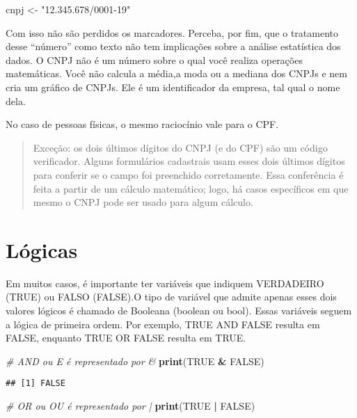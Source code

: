 \documentclass[
]{book}
\newenvironment{Shaded}{\begin{snugshade}}{\end{snugshade}}
\newcommand{\CommentTok}[1]{\textcolor[rgb]{0.56,0.35,0.01}{\textit{#1}}}
\newcommand{\KeywordTok}[1]{\textcolor[rgb]{0.13,0.29,0.53}{\textbf{#1}}}
\newcommand{\NormalTok}[1]{#1}
\newcommand{\OperatorTok}[1]{\textcolor[rgb]{0.81,0.36,0.00}{\textbf{#1}}}
\newcommand{\OtherTok}[1]{\textcolor[rgb]{0.56,0.35,0.01}{#1}}
\newcommand{\StringTok}[1]{\textcolor[rgb]{0.31,0.60,0.02}{#1}}
\begin{document}
\begin{Shaded}
\begin{Highlighting}[]
\NormalTok{cnpj <-}\StringTok{ "12.345.678/0001-19"}
\end{Highlighting}
\end{Shaded}

Com isso não são perdidos os marcadores. Perceba, por fim, que o tratamento desse ``número'' como texto não tem implicações sobre a análise estatística dos dados. O CNPJ não é um número sobre o qual você realiza operações matemáticas. Você não calcula a média,a moda ou a mediana dos CNPJs e nem cria um gráfico de CNPJs. Ele é um identificador da empresa, tal qual o nome dela.

No caso de pessoas físicas, o mesmo raciocínio vale para o CPF.

\begin{quote}
Exceção: os dois últimos dígitos do CNPJ (e do CPF) são um código verificador. Alguns formulários cadastrais usam esses dois últimos dígitos para conferir se o campo foi preenchido corretamente. Essa conferência é feita a partir de um cálculo matemático; logo, há casos específicos em que mesmo o CNPJ pode ser usado para algum cálculo.
\end{quote}

\hypertarget{luxf3gicas}{%
\section{Lógicas}\label{luxf3gicas}}

Em muitos casos, é importante ter variáveis que indiquem VERDADEIRO (TRUE) ou FALSO (FALSE).O tipo de variável que admite apenas esses dois valores lógicos é chamado de Booleana (boolean ou bool). Essas variáveis seguem a lógica de primeira ordem. Por exemplo, TRUE AND FALSE resulta em FALSE, enquanto TRUE OR FALSE resulta em TRUE.

\begin{Shaded}
\begin{Highlighting}[]
\CommentTok{# AND ou E é representado por &}
\KeywordTok{print}\NormalTok{(}\OtherTok{TRUE} \OperatorTok{&}\StringTok{ }\OtherTok{FALSE}\NormalTok{)}
\end{Highlighting}
\end{Shaded}

\begin{verbatim}
## [1] FALSE
\end{verbatim}

\begin{Shaded}
\begin{Highlighting}[]
\CommentTok{# OR ou OU é representado por |}
\KeywordTok{print}\NormalTok{(}\OtherTok{TRUE} \OperatorTok{|}\StringTok{ }\OtherTok{FALSE}\NormalTok{) }
\end{Highlighting}
\end{Shaded}
\end{document}
